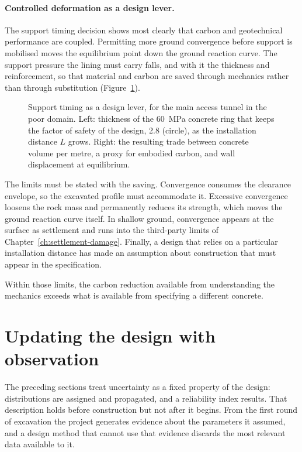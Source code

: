 \paragraph{Controlled deformation as a design lever.}
\label{sec:controlled-deformation-lever}
The support timing decision shows most clearly that carbon and geotechnical
performance are coupled. Permitting more ground
convergence before support is mobilised moves the equilibrium point down the
ground reaction curve. The support pressure the lining must carry falls, and
with it the thickness and reinforcement, so that material and carbon are
saved through mechanics rather than through substitution
(Figure~\ref{fig:controlled-deformation}).

\begin{figure}[htbp]
\centering
{}
\caption{Support timing as a design lever, for the main access tunnel in the poor domain. Left: thickness of the 60~MPa concrete ring that keeps the factor of safety of the design, 2.8 (circle), as the installation distance $L$ grows. Right: the resulting trade between concrete volume per metre, a proxy for embodied carbon, and wall displacement at equilibrium.}
\label{fig:controlled-deformation}
\end{figure}

The limits must be stated with the saving. Convergence consumes
the clearance envelope, so the excavated profile must accommodate it.
Excessive convergence loosens the rock mass and permanently reduces its
strength, which moves the ground reaction curve itself. In shallow ground,
convergence appears at the surface as settlement and runs into the third-party
limits of Chapter~\ref{ch:settlement-damage}. Finally, a design that relies on a
particular installation distance has made an assumption about construction
that must appear in the specification.

Within those limits, the carbon reduction available from understanding the
mechanics exceeds what is available from specifying a different concrete.

\section{Updating the design with observation}
\label{sec:bayesian-updating}

The preceding sections treat uncertainty as a fixed property of the design:
distributions are assigned and propagated, and a reliability index results. That
description holds before construction but not after it begins.
From the first round of excavation the project generates evidence about the
parameters it assumed, and a design method that cannot use that
evidence discards the most relevant data available to it.

